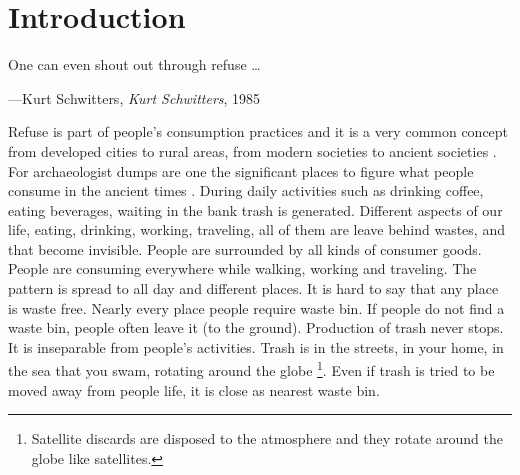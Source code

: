 \chapter{Introduction}

\epigraph{One can even shout out through refuse \ldots}{\hfill---Kurt Schwitters, \textit{Kurt Schwitters}, 1985}





%
%
Refuse is part of people's consumption practices and it is a very common concept from developed cities to rural areas, from modern societies to ancient societies \cite[p.33]{rathje1992rubbish}.  For archaeologist dumps are one the significant places to figure what people consume in the ancient times \cite{rathje1992rubbish}.
 During daily activities such as drinking coffee, eating beverages, waiting in the bank trash is generated. Different aspects of our life, eating, drinking, working, traveling, all of them are leave behind wastes, and that become invisible. People are surrounded by all kinds of consumer goods. People are consuming everywhere while walking, working and traveling. The pattern is spread to all day and different places. It is hard to say that any place is waste free. Nearly every place people require waste bin. If people do not find a waste bin, people often leave it (to the ground). Production of trash never stops. It is inseparable from people's activities.
Trash is in the streets, in your home, in the sea that you swam, rotating around the globe \footnote{Satellite discards are disposed to the atmosphere and they rotate around the globe like satellites.}. Even if trash is tried to be moved away from people life, it is close as nearest waste bin.






